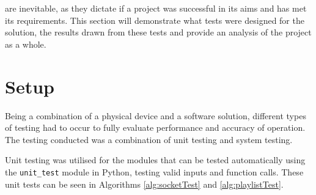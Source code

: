 %

 are inevitable, as they dictate if a project was successful in its aims and has met its requirements. This section will demonstrate what tests were designed for the solution, the results drawn from these tests and provide an analysis of the project as a whole.

\section{Setup}\label{sec:setup}
Being a combination of a physical device and a software solution, different types of testing had to occur to fully evaluate performance and accuracy of operation. The testing conducted was a combination of unit testing and system testing. 

Unit testing was utilised for the modules that can be tested automatically using the \texttt{unit\_test} module in Python, testing valid inputs and function calls. These unit tests can be seen in Algorithms \ref{alg:socketTest} and \ref{alg:playlistTest}.

